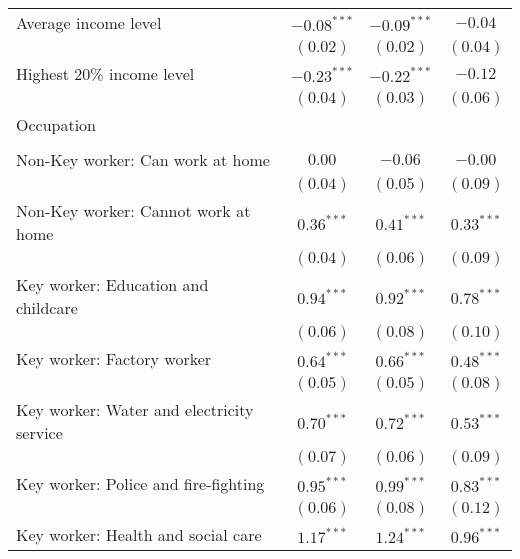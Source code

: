 \begin{table}
\begin{center}
\begin{scriptsize}
\begin{tabular}{l c c c}
\quad Average income level                      & $-0.08^{***}$ & $-0.09^{***}$ & $-0.04$       \\
                                                & $(0.02)$      & $(0.02)$      & $(0.04)$      \\
\quad Highest 20\% income level                 & $-0.23^{***}$ & $-0.22^{***}$ & $-0.12$       \\
                                                & $(0.04)$      & $(0.03)$      & $(0.06)$      \\
Occupation                                      &               &               &               \\
                                                &               &               &               \\
\quad Non-Key worker: Can work at home          & $0.00$        & $-0.06$       & $-0.00$       \\
                                                & $(0.04)$      & $(0.05)$      & $(0.09)$      \\
\quad Non-Key worker: Cannot work at home       & $0.36^{***}$  & $0.41^{***}$  & $0.33^{***}$  \\
                                                & $(0.04)$      & $(0.06)$      & $(0.09)$      \\
\quad Key worker: Education and childcare       & $0.94^{***}$  & $0.92^{***}$  & $0.78^{***}$  \\
                                                & $(0.06)$      & $(0.08)$      & $(0.10)$      \\
\quad Key worker: Factory worker                & $0.64^{***}$  & $0.66^{***}$  & $0.48^{***}$  \\
                                                & $(0.05)$      & $(0.05)$      & $(0.08)$      \\
\quad Key worker: Water and electricity service & $0.70^{***}$  & $0.72^{***}$  & $0.53^{***}$  \\
                                                & $(0.07)$      & $(0.06)$      & $(0.09)$      \\
\quad Key worker: Police and fire-fighting      & $0.95^{***}$  & $0.99^{***}$  & $0.83^{***}$  \\
                                                & $(0.06)$      & $(0.08)$      & $(0.12)$      \\
\quad Key worker: Health and social care        & $1.17^{***}$  & $1.24^{***}$  & $0.96^{***}$  \\

\end{tabular}
\end{scriptsize}
\end{center}
\end{table}
